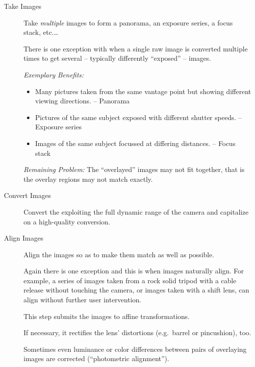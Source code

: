 \begin{description}
\item[Take Images]\itemend
  Take \emph{multiple} images to form a panorama, an exposure series, a focus stack, etc.\dots

  There is one exception with  when a single raw image is converted multiple
  times to get several -- typically differently ``exposed'' -- images.

  \noindent\emph{Exemplary Benefits:}

  \begin{itemize}
  \item
    Many pictures taken from the same vantage point but showing different viewing directions.
    -- Panorama

  \item
    Pictures of the same subject exposed with different shutter speeds.  -- Exposure series

  \item
    Images of the same subject focussed at differing distances.  -- Focus stack
  \end{itemize}

  \noindent\emph{Remaining Problem:} The ``overlayed'' images may not fit together, that is the
  overlay regions may not match exactly.

\item[Convert Images]\itemend
  Convert the  exploiting the full dynamic range of
  the camera and capitalize on a high-quality conversion.

\item[Align Images]\itemend
  Align the images so as to make them match as well as possible.

  Again there is one exception and this is when images naturally align.  For example, a series
  of images taken from a rock solid tripod with a cable release without touching the camera, or
  images taken with a shift lens, can align without further user intervention.

  This step submits the images to affine transformations.

  If necessary, it rectifies the lens' distortions (e.g.\ barrel or pincushion), too.

  Sometimes even luminance or color differences between pairs of overlaying images are corrected
  (``photometric alignment'').


\end{description}
